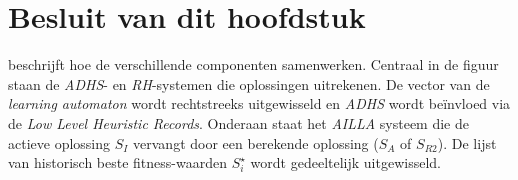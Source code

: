 \section{Besluit van dit hoofdstuk}


 beschrijft hoe de verschillende componenten samenwerken. Centraal in de figuur staan de \emph{ADHS}- en \emph{RH}-systemen die oplossingen uitrekenen. De vector van de \emph{learning automaton} wordt rechtstreeks uitgewisseld en \emph{ADHS} wordt be\"invloed via de \emph{Low Level Heuristic Records}. Onderaan staat het \emph{AILLA} systeem die de actieve oplossing $S_I$ vervangt door een berekende oplossing ($S_A$ of $S_{R2}$). De lijst van historisch beste fitness-waarden $S_i^{\star}$ wordt gedeeltelijk uitgewisseld.